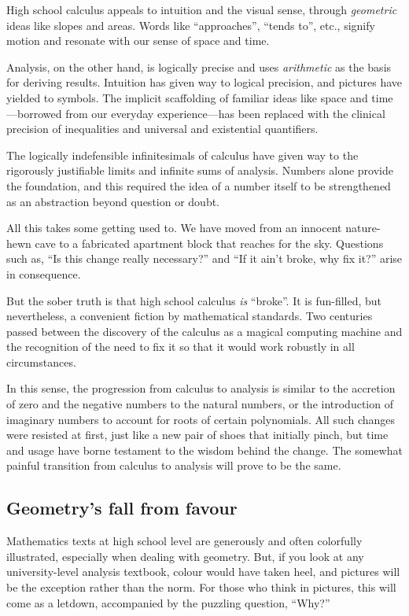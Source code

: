 \documentclass[
  a4paper,
]{article}
\begin{document}
High school calculus appeals to intuition and the visual sense, through
\emph{geometric} ideas like slopes and areas. Words like ``approaches'',
``tends to'', etc., signify motion and resonate with our sense of space
and time.

Analysis, on the other hand, is logically precise and uses
\emph{arithmetic} as the basis for deriving results. Intuition has given
way to logical precision, and pictures have yielded to symbols. The
implicit scaffolding of familiar ideas like space and time---borrowed
from our everyday experience---has been replaced with the clinical
precision of inequalities and universal and existential quantifiers.

The logically indefensible infinitesimals of calculus have given way to
the rigorously justifiable limits and infinite sums of analysis. Numbers
alone provide the foundation, and this required the idea of a number
itself to be strengthened as an abstraction beyond question or doubt.

All this takes some getting used to. We have moved from an innocent
nature-hewn cave to a fabricated apartment block that reaches for the
sky. Questions such as, ``Is this change really necessary?'' and ``If it
ain't broke, why fix it?'' arise in consequence.

But the sober truth is that high school calculus \emph{is} ``broke''. It
is fun-filled, but nevertheless, a convenient fiction by mathematical
standards. Two centuries passed between the discovery of the calculus as
a magical computing machine and the recognition of the need to fix it so
that it would work robustly in all circumstances.

In this sense, the progression from calculus to analysis is similar to
the accretion of zero and the negative numbers to the natural numbers,
or the introduction of imaginary numbers to account for roots of certain
polynomials. All such changes were resisted at first, just like a new
pair of shoes that initially pinch, but time and usage have borne
testament to the wisdom behind the change. The somewhat painful
transition from calculus to analysis will prove to be the same.

\subsection{Geometry's fall from
favour}\label{geometrys-fall-from-favour}

Mathematics texts at high school level are generously and often
colorfully illustrated, especially when dealing with geometry. But, if
you look at any university-level analysis textbook, colour would have
taken heel, and pictures will be the exception rather than the norm. For
those who think in pictures, this will come as a letdown, accompanied by
the puzzling question, ``Why?''
\end{document}
